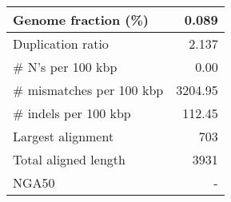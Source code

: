 \documentclass[12pt,a4paper]{article}
\begin{document}
\begin{table}[ht]
\begin{center}
\begin{tabular}{|l*{1}{|r}|}
Genome fraction (\%) & 0.089 \\ \hline
Duplication ratio & 2.137 \\ \hline
\# N's per 100 kbp & 0.00 \\ \hline
\# mismatches per 100 kbp & 3204.95 \\ \hline
\# indels per 100 kbp & 112.45 \\ \hline
Largest alignment & 703 \\ \hline
Total aligned length & 3931 \\ \hline
NGA50 & - \\ \hline
\end{tabular}
\end{center}
\end{table}
\end{document}
